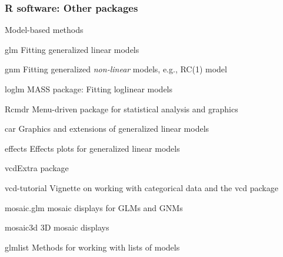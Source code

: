 \begin{frame}[t]
\frametitle{R software: Other packages}
\begin{block}{Model-based methods}
\begin{proglist}
	\item[glm] Fitting generalized linear models 
	\item[gnm] Fitting generalized \emph{non-linear} models, e.g., RC(1) model
	\item[loglm] MASS package: Fitting loglinear models 
	\item[Rcmdr] Menu-driven package for statistical analysis and graphics
	\item[car] Graphics and extensions of generalized linear models 
	\item[effects] Effects plots for generalized linear models 
\end{proglist}
\end{block}
\begin{block}{vcdExtra package}
\begin{proglist}
    \item[vcd-tutorial] Vignette on working with categorical data and the vcd package
	\item[mosaic.glm] mosaic displays for GLMs and GNMs
	\item[mosaic3d] 3D mosaic displays 
	\item[glmlist] Methods for working with lists of models
\end{proglist}
\end{block}

\end{frame}

